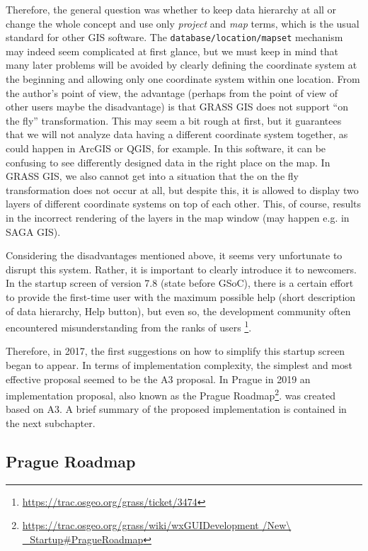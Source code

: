 \documentclass[a4paper,10pt,twoside]{article}
\begin{document}
Therefore, the general question was whether to keep data hierarchy at all or change the whole concept and use only \textit{project} and \textit{map} terms, which is the usual standard for other GIS software. The \texttt {database/location/mapset} mechanism may indeed seem complicated at first glance, but we must keep in mind that many later problems will be avoided by clearly defining the coordinate system at the beginning and allowing only one coordinate system within one location. From the author’s point of view, the advantage (perhaps from the point of view of other users maybe the disadvantage) is that GRASS GIS does not support ``on the fly'' transformation. This may seem a bit rough at first, but it guarantees that we will not analyze data having a different coordinate system together, as could happen in ArcGIS or QGIS, for example. In this software, it can be confusing to see differently designed data in the right place on the map. In GRASS GIS, we also cannot get into a situation that the on the fly transformation does not occur at all, but despite this, it is allowed to display two layers of different coordinate systems on top of each other. This, of course, results in the incorrect rendering of the layers in the map window (may happen e.g. in SAGA GIS).

Considering the disadvantages mentioned above, it seems very unfortunate to disrupt this system. Rather, it is important to clearly introduce it to newcomers. In the startup screen of version 7.8 (state before GSoC), there is a certain effort to provide the first-time user with the maximum possible help (short description of data hierarchy, Help button), but even so, the development community often encountered misunderstanding from the ranks of users \footnote{\url{https://trac.osgeo.org/grass/ticket/3474}}. 

Therefore, in 2017, the first suggestions on how to simplify this startup screen began to appear. In terms of implementation complexity, the simplest and most effective proposal seemed to be the A3 proposal. In Prague in 2019 an implementation proposal, also known as the Prague Roadmap\footnote{\url{https://trac.osgeo.org/grass/wiki/wxGUIDevelopment /New\ _Startup\#PragueRoadmap}}.  was created based on A3. A brief summary of the proposed implementation is contained in the next subchapter.

\newpage
\vspace*{-1cm}
\subsection{Prague Roadmap}
\label{section:Prague Roadmap}
\end{document}
